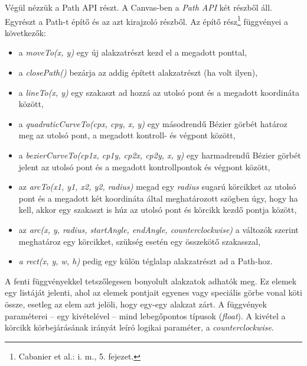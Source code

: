 \documentclass[12pt]{report}
\theoremstyle{definition}
\newcommand{\func}[1]{{\textsl{#1}}}
\begin{document}
Végül nézzük a Path API részt. A Canvas-ben a \emph{Path API} két részből áll.
Egyrészt a Path-t építő és az azt kirajzoló részből. Az építő
rész\footnote{Cabanier et al.: i. m., 5. fejezet.} függvényei a következők:
\begin{itemize}
  \item a \func{moveTo(x, y)} egy új alakzatrészt kezd el a megadott ponttal,
  \item a \func{closePath()} bezárja az addig épített alakzatrészt (ha volt
  ilyen),
  \item a \func{lineTo(x, y)} egy szakaszt ad hozzá az utolsó pont és
  a megadott koordináta között,
  \item a \func{quadraticCurveTo(cpx, cpy, x, y)} egy másodrendű Bézier
  görbét határoz meg az utolsó pont, a megadott kontroll- és végpont között,
  \item a \func{bezierCurveTo(cp1x, cp1y, cp2x, cp2y, x, y)} egy harmadrendű
  Bézier görbét jelent az utolsó pont és a megadott kontrollpontok és végpont
  között,
  \item az \func{arcTo(x1, y1, x2, y2, radius)} megad egy \func{radius} sugarú
  körcikket az utolsó
  pont és a megadott két koordináta által meghatározott szögben úgy,
  hogy ha kell, akkor egy szakaszt is húz az utolsó pont és körcikk kezdő
  pontja között,
  \item az \func{arc(x, y, radius, startAngle, endAngle, counterclockwise)} a
  változók szerint meghatároz egy körcikket, szükség esetén egy összekötő
  szakasszal,
  \item \func{a rect(x, y, w, h)} pedig egy külön téglalap alakzatrészt ad a
  Path-hoz.
\end{itemize}

A fenti függvényekkel tetszőlegesen bonyolult alakzatok adhatók meg. Ez elemek
egy listáját jelenti, ahol az elemek pontjait egyenes vagy speciális görbe
vonal köti össze, esetleg az elem azt jelöli, hogy egy-egy alakzat zárt. A
függvények paraméterei -- egy kivételével -- mind lebegőpontos típusok
(\func{float}). A kivétel a körcikk körbejárásának irányát leíró logikai
paraméter, a \func{counterclockwise}.
\end{document}
